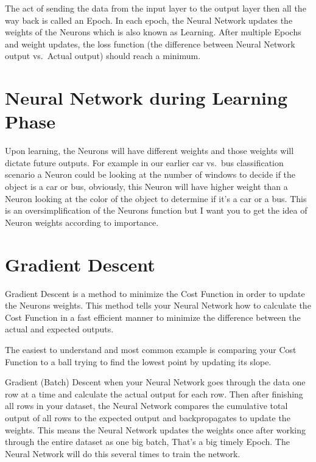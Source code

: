 \documentclass[
]{book}
\begin{document}
The act of sending the data from the input layer to the output layer then all the way back is called an Epoch. In each epoch, the Neural Network updates the weights of the Neurons which is also known as Learning. After multiple Epochs and weight updates, the loss function (the difference between Neural Network output vs.~Actual output) should reach a minimum.

\hypertarget{neural-network-during-learning-phase}{%
\section{Neural Network during Learning Phase}\label{neural-network-during-learning-phase}}

Upon learning, the Neurons will have different weights and those weights will dictate future outputs. For example in our earlier car vs.~bus classification scenario a Neuron could be looking at the number of windows to decide if the object is a car or bus, obviously, this Neuron will have higher weight than a Neuron looking at the color of the object to determine if it's a car or a bus. This is an oversimplification of the Neurons function but I want you to get the idea of Neuron weights according to importance.

\hypertarget{gradient-descent}{%
\section{Gradient Descent}\label{gradient-descent}}

Gradient Descent is a method to minimize the Cost Function in order to update the Neurons weights. This method tells your Neural Network how to calculate the Cost Function in a fast efficient manner to minimize the difference between the actual and expected outputs.

The easiest to understand and most common example is comparing your Cost Function to a ball trying to find the lowest point by updating its slope.

Gradient (Batch) Descent when your Neural Network goes through the data one row at a time and calculate the actual output for each row. Then after finishing all rows in your dataset, the Neural Network compares the cumulative total output of all rows to the expected output and backpropagates to update the weights. This means the Neural Network updates the weights once after working through the entire dataset as one big batch, That's a big timely Epoch. The Neural Network will do this several times to train the network.
\end{document}

